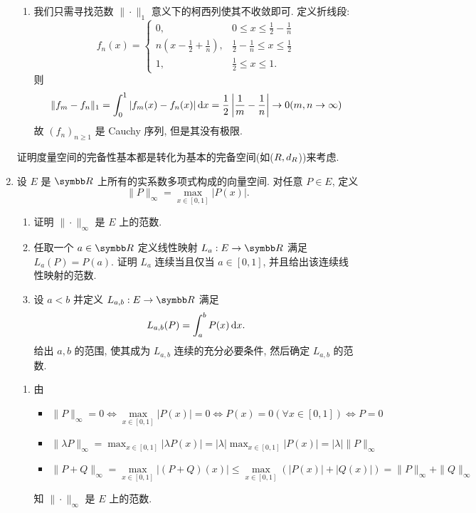 \begin{enumerate}
\begin{answer}
\begin{enumerate}
          \item 我们只需寻找范数 $\|\cdot\|_1$ 意义下的柯西列使其不收敛即可. 定义折线段:
          \[f_n(x)=\begin{cases}
          0, & 0\leq x\leq\frac{1}{2}-\frac{1}{n} \\
          n\left(x-\frac{1}{2}+\frac{1}{n}\right), & \frac{1}{2}-\frac{1}{n}\leq x\leq\frac{1}{2} \\
          1, & \frac{1}{2}\leq x\leq 1.
          \end{cases}\]
          则
          \[\|f_m-f_n\|_1=\int_0^1|f_m(x)-f_n(x)|\mathop{}\!\mathrm{d} x=\frac{1}{2}\left\lvert\frac{1}{m}-\frac{1}{n}\right\rvert\to 0(m,n\to\infty)\]
          故 $(f_n)_{n\geq 1}$ 是 Cauchy 序列, 但是其没有极限.
      \end{enumerate}
    \end{answer}
    \begin{remark}
      证明度量空间的完备性基本都是转化为基本的完备空间(如($\\R,d_{\\R}$))来考虑.
    \end{remark}
  \item 设 $E$ 是 $\R $ 上所有的实系数多项式构成的向量空间. 对任意 $P\in E$, 定义
  \[\|P\|_{\infty}=\max_{x\in[0,1]}|P(x)|.\]
    \begin{enumerate}
    \item 证明 $\|\cdot\|_{\infty}$ 是 $E$ 上的范数.
    \item 任取一个 $a\in\R $ 定义线性映射 $L_a:E\to\R $ 满足 $L_a(P)=P(a)$. 证明 $L_a$ 连续当且仅当 $a\in[0,1]$, 并且给出该连续线性映射的范数.
    \item 设 $a<b$ 并定义 $L_{a,b}:E\to\R $ 满足
    \[L_{a,b}(P)=\int_a^bP(x)\mathop{}\!\mathrm{d} x.\]
    给出 $a,b$ 的范围, 使其成为 $L_{a,b}$ 连续的充分必要条件, 然后确定 $L_{a,b}$ 的范数.
    \end{enumerate}
    \begin{answer}
      \begin{enumerate}
        \item 由
        \begin{itemize}
            \item $\|P\|_\infty =0\Leftrightarrow\max\limits_{x\in [0,1]}|P(x)|=0\Leftrightarrow P(x)=0(\forall x\in [0,1])\Leftrightarrow P=0$
            \item $\|\lambda P\|_\infty =\max_{x\in [0,1]}|\lambda P(x)|=|\lambda |\max_{x\in [0,1]}|P(x)|=|\lambda|\|P\|_{\infty}$
            \item $\|P+Q\|_{\infty}=\max\limits_{x\in [0,1]}|(P+Q)(x)|\leq\max\limits_{x\in [0,1]}(|P(x)|+|Q(x)|)=\|P\|_{\infty}+\|Q\|_{\infty}$
        \end{itemize}
        知 $\|\cdot\|_{\infty}$ 是 $E$ 上的范数.
  

\end{enumerate}
\end{answer}
\end{enumerate}

